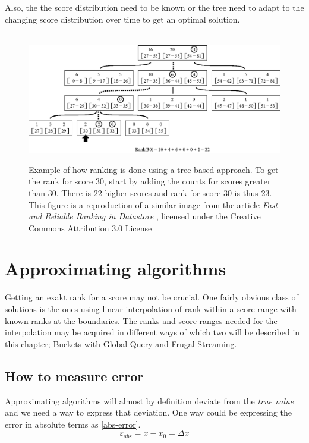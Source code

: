 Also, the the score distribution need to be known or the tree need to adapt to the changing score distribution over time to get an optimal solution.

\begin{figure}[h!]
  \centering
  \caption{Example of how ranking is done using a tree-based approach. To get the rank for score 30, start by adding the counts for scores greater than 30. There is 22 higher scores and rank for score 30 is thus 23.\\This figure is a reproduction of a similar image from the article \emph{Fast and Reliable Ranking in Datastore} \cite{ranking-in-datastore} 
 , licensed under the Creative Commons Attribution 3.0 License}   \label{fig:tree}
\hbox{\hspace{-0.8cm}
  \includegraphics[width=15cm]{img/tree.eps}}
\end{figure}

\section{Approximating algorithms}

Getting an exakt rank for a score may not be crucial. One fairly obvious class of solutions is the ones using linear interpolation of rank within a score range with known ranks at the boundaries. The ranks and score ranges needed for the interpolation may be acquired in different ways of which two will be described in this chapter; Buckets with Global Query and Frugal Streaming.

\subsection{How to measure error}

Approximating algorithms will almost by definition deviate from the \emph{true value} and we need a way to express that deviation. 
One way could be expressing the error in absolute terms as \ref{abs-error}.
\begin{equation}
  \label{abs-error}
  \varepsilon_{abs} = x - x_0 = \Delta x
  \end{equation}

